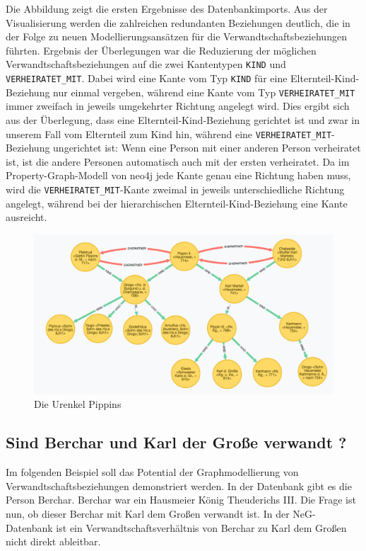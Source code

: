 \documentclass[12pt,ngerman,]{article}
\begin{document}
Die Abbildung zeigt die ersten Ergebnisse des Datenbankimports. Aus der
Visualisierung werden die zahlreichen redundanten Beziehungen deutlich,
die in der Folge zu neuen Modellierungsansätzen für die
Verwandtschaftsbeziehungen führten. Ergebnis der Überlegungen war die
Reduzierung der möglichen Verwandtschaftsbeziehungen auf die zwei
Kantentypen \texttt{KIND} und \texttt{VERHEIRATET\_MIT}. Dabei wird eine
Kante vom Typ \texttt{KIND} für eine Elternteil-Kind-Beziehung nur
einmal vergeben, während eine Kante vom Typ \texttt{VERHEIRATET\_MIT}
immer zweifach in jeweils umgekehrter Richtung angelegt wird. Dies
ergibt sich aus der Überlegung, dass eine Elternteil-Kind-Beziehung
gerichtet ist und zwar in unserem Fall vom Elternteil zum Kind hin,
während eine \texttt{VERHEIRATET\_MIT}-Beziehung ungerichtet ist: Wenn
eine Person mit einer anderen Person verheiratet ist, ist die andere
Personen automatisch auch mit der ersten verheiratet. Da im
Property-Graph-Modell von neo4j jede Kante genau eine Richtung haben
muss, wird die \texttt{VERHEIRATET\_MIT}-Kante zweimal in jeweils
unterschiedliche Richtung angelegt, während bei der hierarchischen
Elternteil-Kind-Beziehung eine Kante ausreicht.

\begin{figure}
\centering
\includegraphics{Bilder/NeG/030-Urenkel-Pippins.jpg}
\caption{Die Urenkel Pippins}
\end{figure}

\subsection{Sind Berchar und Karl der Große verwandt
?}\label{sind-berchar-und-karl-der-grouxdfe-verwandt}

Im folgenden Beispiel soll das Potential der Graphmodellierung von
Verwandtschaftsbeziehungen demonstriert werden. In der Datenbank gibt es
die Person Berchar. Berchar war ein Hausmeier König Theuderichs III. Die
Frage ist nun, ob dieser Berchar mit Karl dem Großen verwandt ist. In
der NeG-Datenbank ist ein Verwandtschaftsverhältnis von Berchar zu Karl
dem Großen nicht direkt ableitbar.
\end{document}
